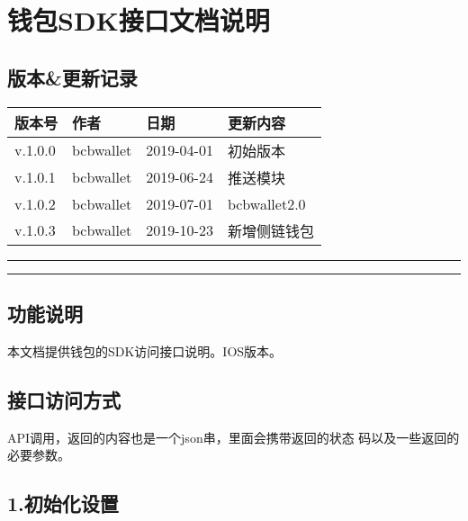 \documentclass[letterpaper,10pt,english]{sphinxmanual}
\begin{document}
\chapter{钱包SDK接口文档说明}
\label{\detokenize{BCBWalletSDK_u63a5_u53e3_u8bf4_u660e:sdk}}\label{\detokenize{BCBWalletSDK_u63a5_u53e3_u8bf4_u660e::doc}}

\section{版本\&更新记录}
\label{\detokenize{BCBWalletSDK_u63a5_u53e3_u8bf4_u660e:id1}}

\begin{savenotes}\sphinxattablestart
\centering
\begin{tabulary}{\linewidth}[t]{|T|T|T|T|}
\hline
\sphinxstyletheadfamily 
版本号
&\sphinxstyletheadfamily 
作者
&\sphinxstyletheadfamily 
日期
&\sphinxstyletheadfamily 
更新内容
\\
\hline
v.1.0.0
&
bcbwallet
&
2019-04-01
&
初始版本
\\
\hline
v.1.0.1
&
bcbwallet
&
2019-06-24
&
推送模块
\\
\hline
v.1.0.2
&
bcbwallet
&
2019-07-01
&
bcbwallet2.0
\\
\hline
v.1.0.3
&
bcbwallet
&
2019-10-23
&
新增侧链钱包
\\
\hline
\end{tabulary}
\par
\sphinxattableend\end{savenotes}


\bigskip\hrule\bigskip



\bigskip\hrule\bigskip



\section{功能说明}
\label{\detokenize{BCBWalletSDK_u63a5_u53e3_u8bf4_u660e:id2}}
本文档提供钱包的SDK访问接口说明。IOS版本。


\section{接口访问方式}
\label{\detokenize{BCBWalletSDK_u63a5_u53e3_u8bf4_u660e:id3}}
API调用，返回的内容也是一个json串，里面会携带返回的状态
码以及一些返回的必要参数。


\section{1.初始化设置}
\label{\detokenize{BCBWalletSDK_u63a5_u53e3_u8bf4_u660e:id4}}
\end{document}
